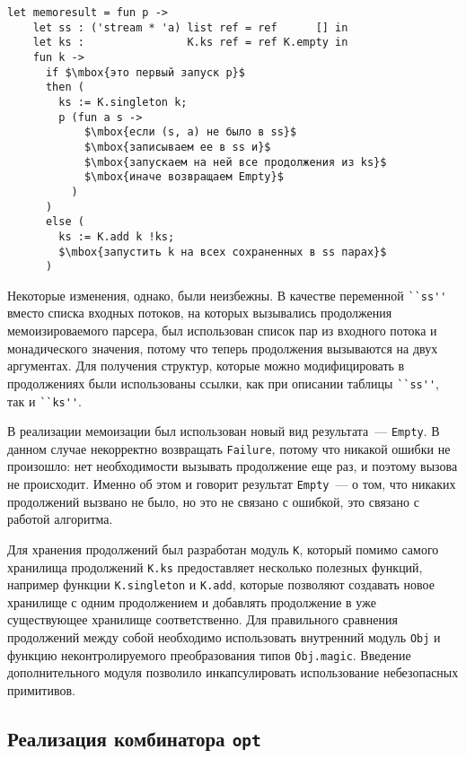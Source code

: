 \documentclass[conference]{IEEEtran}
\begin{document}
\begin{lstlisting}[basicstyle=\small]
  let memoresult = fun p ->
    let ss : ('stream * 'a) list ref = ref      [] in
    let ks :                K.ks ref = ref K.empty in
    fun k ->
      if $\mbox{это первый запуск p}$
      then (
        ks := K.singleton k;
        p (fun a s ->
            $\mbox{если (s, a) не было в ss}$
            $\mbox{записываем ее в ss и}$
            $\mbox{запускаем на ней все продолжения из ks}$
            $\mbox{иначе возвращаем Empty}$
          )
      )
      else (
        ks := K.add k !ks;
        $\mbox{запустить k на всех сохраненных в ss парах}$
      )
\end{lstlisting}

Некоторые изменения, однако, были неизбежны. В качестве переменной \lstinline|``ss''| вместо списка входных потоков, на которых вызывались продолжения мемоизироваемого парсера, был использован список
пар из входного потока и монадического значения, потому что теперь продолжения вызываются на двух аргументах. Для получения структур, которые можно модифицировать в продолжениях были
использованы ссылки, как при описании таблицы \lstinline|``ss''|, так и \lstinline|``ks''|.

В реализации мемоизации был использован новый вид результата~--- \lstinline|Empty|. В данном случае некорректно возвращать \lstinline|Failure|, потому что никакой ошибки не произошло:
нет необходимости вызывать продолжение еще раз, и поэтому вызова не происходит. Именно об этом и говорит результат \lstinline|Empty|~--- о том, что никаких продолжений
вызвано не было, но это не связано с ошибкой, это связано с работой алгоритма.

Для хранения продолжений был разработан модуль \lstinline|K|, который помимо самого хранилища продолжений \lstinline|K.ks| предоставляет несколько полезных функций, например
функции \lstinline|K.singleton| и  \lstinline|K.add|, которые позволяют создавать новое хранилище с одним продолжением и добавлять продолжение в уже существующее хранилище
соответственно. Для правильного сравнения продолжений между собой необходимо использовать внутренний модуль \lstinline|Obj| и функцию неконтролируемого преобразования типов
\lstinline|Obj.magic|. Введение дополнительного модуля позволило инкапсулировать использование небезопасных примитивов.

\subsection{Реализация комбинатора \lstinline|opt|}
\end{document}
